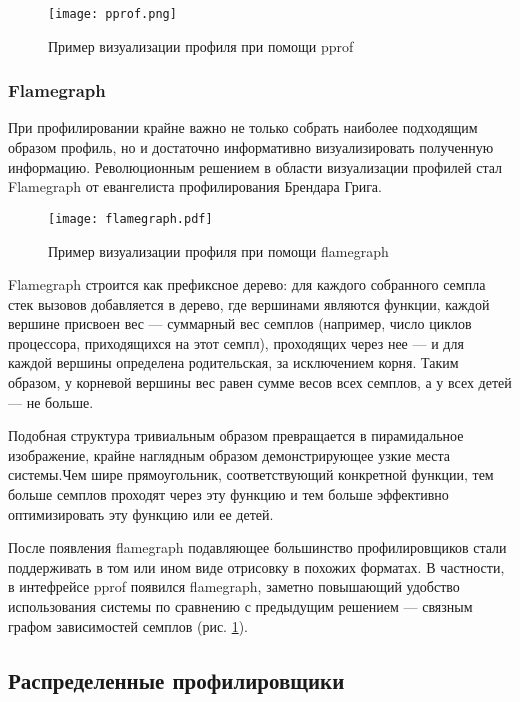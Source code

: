 \begin{figure}[H]
    \centering
    \texttt{[image: pprof.png]}
    \caption{Пример визуализации профиля при помощи pprof}
    \label{fig:pprof}
\end{figure}

\subsubsection{Flamegraph}
При профилировании крайне важно не только собрать наиболее подходящим образом профиль, но и достаточно информативно визуализировать
полученную информацию. Революционным решением в области визуализации профилей стал Flamegraph \cite{flamegraph}
от евангелиста профилирования Брендара Грига.

\begin{figure}[H]
    \centering
    \texttt{[image: flamegraph.pdf]}
    \caption{Пример визуализации профиля при помощи flamegraph}
    \label{fig:flamegraph}
\end{figure}

Flamegraph строится как префиксное дерево: для каждого собранного семпла стек вызовов добавляется в дерево, где вершинами являются
функции, каждой вершине присвоен вес --- суммарный вес семплов (например, число циклов процессора, приходящихся на этот семпл),
проходящих через нее --- и для каждой вершины определена родительская, за исключением корня.
Таким образом, у корневой вершины вес равен сумме весов всех семплов, а у всех детей --- не больше.

Подобная структура тривиальным образом превращается в пирамидальное изображение, крайне наглядным образом демонстрирующее узкие места системы.Чем шире прямоугольник, соответствующий конкретной функции, тем больше семплов проходят через эту функцию и тем больше эффективно
оптимизировать эту функцию или ее детей.

После появления flamegraph подавляющее большинство профилировщиков стали поддерживать в том или ином виде отрисовку в похожих форматах.
В частности, в интефрейсе pprof появился flamegraph, заметно повышающий удобство использования системы по сравнению с предыдущим решением ---
связным графом зависимостей семплов (рис. \ref{fig:pprof}).

\subsection{Распределенные профилировщики}


